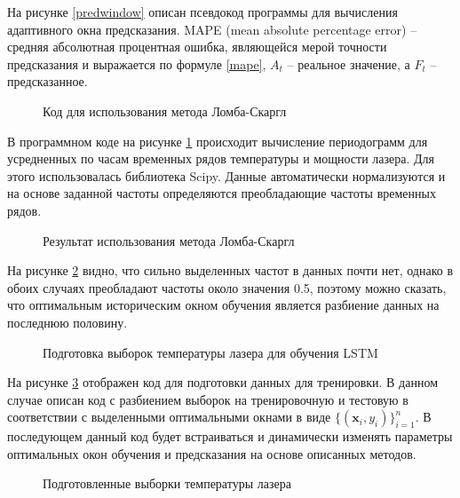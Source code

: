 На рисунке \ref{predwindow} описан псевдокод программы для вычисления адаптивного окна предсказания.
MAPE (mean absolute percentage error) -- средняя абсолютная процентная ошибка,
являющейся мерой точности предсказания и выражается по формуле \ref{mape},
$A_t$ -- реальное значение, а $F_t$ -- предсказанное.

\begin{figure}[H]
    \caption{Код для использования метода Ломба-Скаргл}
    \label{optimalcode}
\end{figure}

В программном коде на рисунке \ref{optimalcode}  происходит
вычисление периодограмм для усредненных по часам временных рядов
температуры и мощности лазера. Для этого использовалась библиотека Scipy.
Данные автоматически нормализуются и на основе заданной частоты определяются преобладающие частоты временных рядов.

\begin{figure}[H]
    \caption{Результат использования метода Ломба-Скаргл}
    \label{optimal}
\end{figure}

На рисунке \ref{optimal} видно, что сильно выделенных частот в данных почти нет,
однако в обоих случаях преобладают частоты около значения 0.5, поэтому
можно сказать, что оптимальным историческим окном обучения является разбиение данных на последнюю половину.

\begin{figure}[H]
    \caption{Подготовка выборок температуры лазера для обучения LSTM}
    \label{preptemp}
\end{figure}

На рисунке \ref{preptemp} отображен код для подготовки данных для тренировки.
В данном случае описан код с разбиением выборок на тренировочную и тестовую
в соответствии с выделенными оптимальными окнами в виде $\{(\textbf{x}_i,y_i)\}_{i=1}^n$.
В последующем данный код будет встраиваться и динамически
изменять параметры оптимальных окон обучения и предсказания
на основе описанных методов.
 
\begin{figure}[H]
    \caption{Подготовленные выборки температуры лазера}
    \label{samptemp}
\end{figure}

